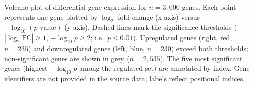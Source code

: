 \caption{Volcano plot of differential gene expression for $n=3{,}000$ genes.
Each point represents one gene plotted by $\log_2$ fold change (x-axis) versus
$-\log_{10}(p\text{-value})$ (y-axis).
Dashed lines mark the significance thresholds ($|\!\log_2\mathrm{FC}|\geq1$,
$-\log_{10}p\geq2$; i.e.\ $p\leq0.01$).
Upregulated genes (right, \textcolor[HTML]{DD4949}{red}, $n=235$) and
downregulated genes (left, \textcolor[HTML]{4C72B0}{blue}, $n=230$) exceed both thresholds;
non-significant genes are shown in grey ($n=2{,}535$).
The five most significant genes (highest $-\log_{10}p$ among the regulated set) are annotated by index.
Gene identifiers are not provided in the source data; labels reflect positional indices.}
